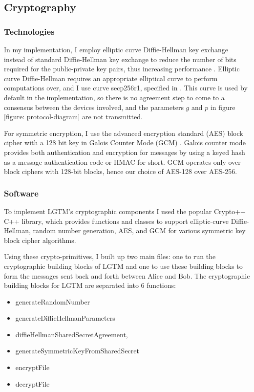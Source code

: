 \documentclass[12pt]{report}
\begin{document}
\subsection{Cryptography}
\subsubsection{Technologies}
In my implementation, I employ elliptic curve Diffie-Hellman key exchange instead of standard Diffie-Hellman key exchange to reduce the number of bits required for the public-private key pairs, thus increasing performance \cite{FastEllipticCurveDiffieHellmanBernstein2006}. Elliptic curve Diffie-Hellman requires an appropriate elliptical curve to perform computations over, and I use curve secp256r1, specified in \cite{EllipticCurvesStandard2009}. This curve is used by default in the implementation, so there is no agreement step to come to a consensus between the devices involved, and the parameters $g$ and $p$ in figure \ref{figure: protocol-diagram} are not transmitted. \par

For symmetric encryption, I use the advanced encryption standard (AES) block cipher with a 128 bit key \cite{AesNist2001} in Galois Counter Mode (GCM) \cite{GcmModeMcGrewNist2005}. Galois counter mode provides both authentication and encryption for messages by using a keyed hash as a message authentication code or HMAC for short. GCM operates only over block ciphers with 128-bit blocks, hence our choice of AES-128 over AES-256. \par

\subsubsection{Software}
To implement LGTM's cryptographic components I used the popular Crypto++ C++ library, which provides functions and classes to support elliptic-curve Diffie-Hellman, random number generation, AES, and GCM for various symmetric key block cipher algorithms. \par

Using these crypto-primitives, I built up two main files: one to run the cryptographic building blocks of LGTM and one to use these building blocks to form the messages sent back and forth between Alice and Bob. The cryptographic building blocks for LGTM are separated into 6 functions: 

\begin{itemize}
    \item generateRandomNumber
    \item generateDiffieHellmanParameters
    \item diffieHellmanSharedSecretAgreement, 
    \item generateSymmetricKeyFromSharedSecret
    \item encryptFile
    \item decryptFile
\end{itemize}
\end{document}
